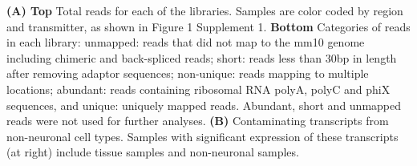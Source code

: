 \textbf{(A) Top} Total reads for each of the libraries. Samples are color coded by region and transmitter, as shown in Figure 1 Supplement 1.
\textbf {Bottom} Categories of reads in each library: unmapped: reads that did not map to the mm10 genome including chimeric and back-spliced reads; short: reads less than 30bp in length after removing adaptor sequences; non-unique: reads mapping to multiple locations; abundant: reads containing ribosomal RNA polyA, polyC and phiX sequences, and unique: uniquely mapped reads. Abundant, short and unmapped reads were not used for further analyses.
\textbf{(B)} Contaminating transcripts from non-neuronal cell types. Samples with significant expression of these transcripts (at right) include tissue samples and non-neuronal samples. 
